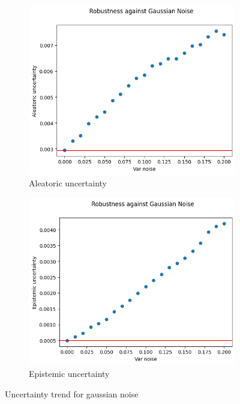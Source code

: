\begin{figure}[h]
	\centering
	\begin{subfigure}{.5\textwidth}
		\centering
		\includegraphics[width=0.9\linewidth]{ImageFiles/EvalBNN/GN/aleatoric}
		\caption{Aleatoric uncertainty}
		\label{fig:gn_aleatoric}
	\end{subfigure}%
	\begin{subfigure}{.5\textwidth}
		\centering
		\includegraphics[width=0.9\linewidth]{ImageFiles/EvalBNN/GN/epistemic}
		\caption{Epistemic uncertainty}
		\label{fig:gn_epistemic}
	\end{subfigure}
	\caption{Uncertainty trend for gaussian noise}
	\label{fig:gn_uncertainty}
\end{figure}

